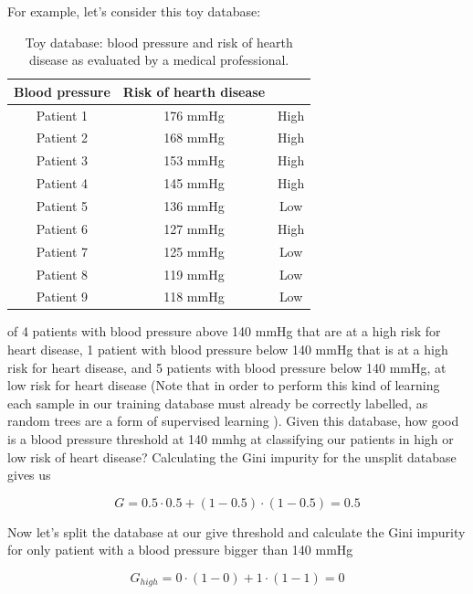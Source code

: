 \documentclass[a4paper]{report}
\begin{document}
For example, let's consider this toy database:

\begin{table}[H]
  \begin{center}
    \begin{tabular}{c|c|c} %
      \textbf{Blood pressure} & \textbf{Risk of hearth disease}\\
      \hline
      Patient 1 &  176 mmHg & High\\
      Patient 2 &  168 mmHg & High\\
      Patient 3 &  153 mmHg & High\\
      Patient 4 &  145 mmHg & High\\
      Patient 5 &  136 mmHg & Low\\
      Patient 6 &  127 mmHg & High\\
      Patient 7 &  125 mmHg & Low\\
      Patient 8 &  119 mmHg & Low\\
      Patient 9 &  118 mmHg & Low\\
    \end{tabular}
    \caption{Toy database: blood pressure and risk of hearth disease as evaluated by a medical professional.}
    \label{tree_table}
  \end{center}
\end{table}


of 4 patients with blood pressure above 140 mmHg that are at a high risk for heart disease, 1 patient with blood pressure below 140 mmHg that is at a high risk for heart disease, and 5 patients with blood pressure below 140 mmHg, at low risk for heart disease (Note that in order to perform this kind of learning each sample in our training database must already be correctly labelled, as random trees are a form of supervised learning ).
Given this database, how good is a blood pressure threshold at 140 mmhg at classifying our patients in high or low risk of heart disease?
Calculating the Gini impurity for the unsplit database gives us

\begin{equation}
    G = 0.5 \cdot 0.5 + (1-0.5) \cdot (1-0.5) = 0.5
\end{equation}

Now let's split the database at our give threshold and calculate the Gini impurity for only patient with a blood pressure bigger than 140 mmHg

\begin{equation}
    G_{high} = 0 \cdot (1 -0) + 1 \cdot (1-1) = 0
\end{equation}
\end{document}
